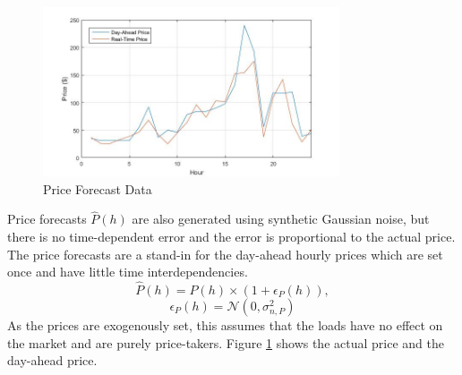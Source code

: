 \documentclass[journal]{IEEEtran}
\begin{document}
\begin{figure}[t]
\centering
\includegraphics[width=\linewidth, height=5cm]{"pricefig"}
\caption[]{Price Forecast Data}
\label{fig:price1}
\end{figure}

Price forecasts \(\hat P(h)\) are also generated using synthetic Gaussian noise, but there is no time-dependent error and the error is proportional to the actual price. The price forecasts are a stand-in for the day-ahead hourly prices which are set once and have little time interdependencies. 
\[ \hat{P}(h)=P(h) \times (1 + \epsilon_{P}(h)),\]
\[\epsilon_{P}(h) = \mathcal N (0, \sigma_{n,P}^2)\]
As the prices are exogenously set, this assumes that the loads have no effect on the market and are purely price-takers. Figure \ref{fig:price1} shows the actual price and the day-ahead price.
\end{document}
